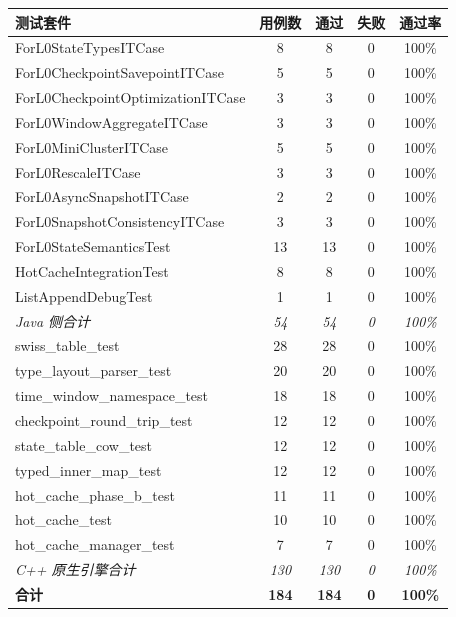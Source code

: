\documentclass[a4paper,11pt]{article}
\begin{document}
\begin{table}[H]
\centering
\small
\begin{tabular}{@{}l cccc@{}}
\toprule
\textbf{测试套件} & \textbf{用例数} & \textbf{通过} & \textbf{失败} & \textbf{通过率} \\
\midrule
ForL0StateTypesITCase                   & 8  & 8  & 0 & 100\% \\
ForL0CheckpointSavepointITCase          & 5  & 5  & 0 & 100\% \\
ForL0CheckpointOptimizationITCase       & 3  & 3  & 0 & 100\% \\
ForL0WindowAggregateITCase              & 3  & 3  & 0 & 100\% \\
ForL0MiniClusterITCase                  & 5  & 5  & 0 & 100\% \\
ForL0RescaleITCase                      & 3  & 3  & 0 & 100\% \\
ForL0AsyncSnapshotITCase                & 2  & 2  & 0 & 100\% \\
ForL0SnapshotConsistencyITCase          & 3  & 3  & 0 & 100\% \\
ForL0StateSemanticsTest                 & 13 & 13 & 0 & 100\% \\
HotCacheIntegrationTest                 & 8  & 8  & 0 & 100\% \\
ListAppendDebugTest                     & 1  & 1  & 0 & 100\% \\
\midrule
\textit{Java 侧合计}                    & \textit{54} & \textit{54} & \textit{0} & \textit{100\%} \\
\midrule
swiss\_table\_test                      & 28 & 28 & 0 & 100\% \\
type\_layout\_parser\_test              & 20 & 20 & 0 & 100\% \\
time\_window\_namespace\_test           & 18 & 18 & 0 & 100\% \\
checkpoint\_round\_trip\_test           & 12 & 12 & 0 & 100\% \\
state\_table\_cow\_test                 & 12 & 12 & 0 & 100\% \\
typed\_inner\_map\_test                 & 12 & 12 & 0 & 100\% \\
hot\_cache\_phase\_b\_test              & 11 & 11 & 0 & 100\% \\
hot\_cache\_test                        & 10 & 10 & 0 & 100\% \\
hot\_cache\_manager\_test               &  7 &  7 & 0 & 100\% \\
\midrule
\textit{C++ 原生引擎合计}                & \textit{130} & \textit{130} & \textit{0} & \textit{100\%} \\
\midrule
\textbf{合计}                            & \textbf{184} & \textbf{184} & \textbf{0} & \textbf{100\%} \\
\bottomrule
\end{tabular}
\end{table}
\end{document}
